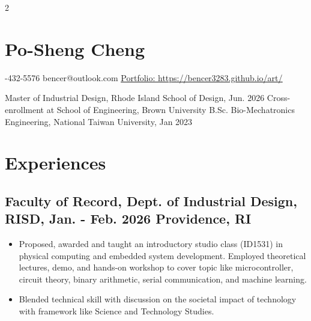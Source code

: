 \documentclass[12pt]{article}
\begin{document}
\begin{multicols}{2}
    \section*{Po-Sheng Cheng}
    
    -432-5576 \newline
    bencer@outlook.com \newline
    \href{https://bencer3283.github.io/art/}{\underline{Portfolio: https://bencer3283.github.io/art/}}
\end{multicols}
{\sffamily \small \noindent
    Master of Industrial Design, Rhode Island School of Design, Jun. 2026 \newline \indent Cross-enrollment at School of Engineering, Brown University \newline
    B.Sc. Bio-Mechatronics Engineering, National Taiwan University, Jan 2023
    }
    \section*{Experiences}
    \subsection*{Faculty of Record, Dept. of Industrial Design, RISD, Jan. - Feb. 2026 \hfill Providence, RI}
    {\small
    \begin{itemize}
        \item Proposed, awarded and taught an introductory studio class (ID1531) in physical computing and embedded system development. Employed theoretical lectures, demo, and hands-on workshop to cover topic like microcontroller, circuit theory, binary arithmetic, serial communication, and machine learning.
        \item Blended technical skill with discussion on the societal impact of technology with framework like Science and Technology Studies.  
    \end{itemize}
    }
\end{document}
